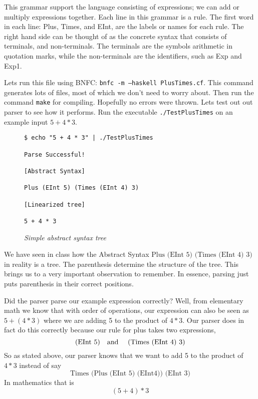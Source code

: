\documentclass{article}
\begin{document}
\medskip\noindent
This grammar support the language consisting of expressions; we can add or multiply expressions together. Each line in this grammar is a rule. The first word in each line: Plus, Times, and EInt, are the labels or names for each rule. The right hand side can be thought of as the concrete syntax that consists of terminals, and non-terminals. The terminals are the symbols arithmetic in quotation marks, while the non-terminals are the identifiers, such as Exp and Exp1. 

\medskip\noindent
Lets run this file using BNFC: \texttt{bnfc -m --haskell PlusTimes.cf}. This command generates lots of files, most of which we don't need to worry about. Then run the command \texttt{make} for compiling. Hopefully no errors were thrown. Lets test out out parser to see how it performs. Run the executable \texttt{./TestPlusTimes} on an example input $ 5 + 4 * 3$.

\begin{figure}[H]
    \begin{lstlisting}
$ echo "5 + 4 * 3" | ./TestPlusTimes

Parse Successful!

[Abstract Syntax]

Plus (EInt 5) (Times (EInt 4) 3)

[Linearized tree]

5 + 4 * 3

    \end{lstlisting}
    \caption{\textit{Simple abstract syntax tree}}
\end{figure}
\noindent
We have seen in class how the Abstract Syntax $\textrm{Plus (EInt 5) (Times (EInt 4) 3)}$ in reality is a tree. The parenthesis determine the structure of the tree. This brings us to a very important observation to remember. In essence, parsing just puts parenthesis in their correct positions. 

\medskip\noindent
Did the parser parse our example expression correctly? Well, from elementary math we know that with order of operations, our expression can also be seen as $5 + (4 * 3)$ where we are adding 5 to the product of $4 * 3$. Our parser does in fact do this correctly because our rule for plus takes two expressions, $$\textrm{(EInt 5)\quad and \quad(Times (EInt 4) 3)}$$ So as stated above, our parser knows that we want to add 5 to the product of $4 * 3$ instead of say $$\textrm{Times (Plus (EInt 5) (EInt4)) (EInt 3)}$$ In mathematics that is $$(5+4) * 3$$
\end{document}
